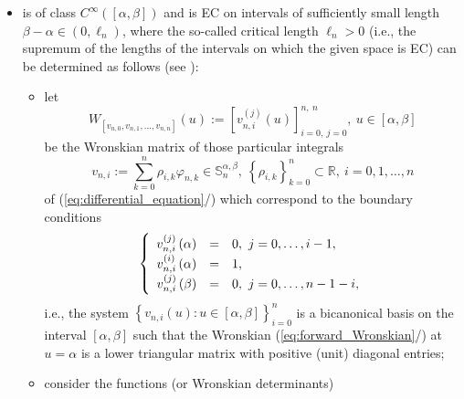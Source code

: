\documentclass[b5paper, twosided]{book}
\DeclareRobustCommand{\mref}[1]{\ref{#1}{\relsize{-1}/\pageref{#1}}}
\begin{document}
\begin{itemize}
    \item
    is of class $C^{\infty}\left(\left[\alpha,\beta\right]\right)$ and is EC on intervals of sufficiently small length $\beta-\alpha \in \left(0,\ell_n\right)$, where the so-called critical length $\ell_n > 0$ (i.e., the supremum of the lengths of the intervals on which the given space is EC) can be determined as follows (see \cite[Proposition 3.1]{CarnicerMainarPena2004}):
    \begin{itemize}
        \item
        let
        \begin{equation}
            W_{\left[  v_{n,0},v_{n,1},\ldots,v_{n,n}\right]  }\left(  u\right)  :=
            \left[
            v_{n,i}^{\left(j\right)}\left(u\right)
            \right]_{i=0,~j=0}^{n,~n},~u\in\left[\alpha,\beta\right]
            \label{eq:forward_Wronskian}
        \end{equation}
        be the Wronskian matrix of those particular integrals
        \begin{equation}
            v_{n,i}:=\sum_{k=0}^{n}\rho_{i,k}\varphi_{n,k}\in\mathbb{S}_{n}^{\alpha,\beta
            },~\left\{\rho_{i,k}\right\}_{k=0}^{n}\subset\mathbb{R},~i=0,1,\ldots,n\label{eq:particular_integrals}%
        \end{equation}
        of (\mref{eq:differential_equation}) which correspond to the boundary conditions%
        \begin{equation}
            \def\arraystretch{1.3}
            \left\{
            \begin{array}{rcl}
                v_{n,i}^{\left(  j\right)  }\left(  \alpha\right)    & = & 0,~j=0,\ldots,i-1,\\
                v_{n,i}^{\left(  i\right)  }\left(  \alpha\right)    & = & 1,\\
                v_{n,i}^{\left(  j\right)  }\left(  \beta\right)    & =& 0 ,~j=0,\ldots,n-1-i,
            \end{array}
            \right.
            \def\arraystretch{1.0}
            \label{eq:boundary_conditions}
        \end{equation}
        i.e., the system $\left\{  v_{n,i}\left(  u\right)  :u\in\left[
        \alpha,\beta\right]  \right\}  _{i=0}^{n}$ is a bicanonical basis on the interval $\left[\alpha, \beta\right]$ such that the Wronskian (\mref{eq:forward_Wronskian}) at $u=\alpha$ is a
        lower triangular matrix with positive (unit) diagonal entries;
        \item
        consider the functions (or Wronskian determinants)%

\end{itemize}
\end{itemize}
\end{document}

